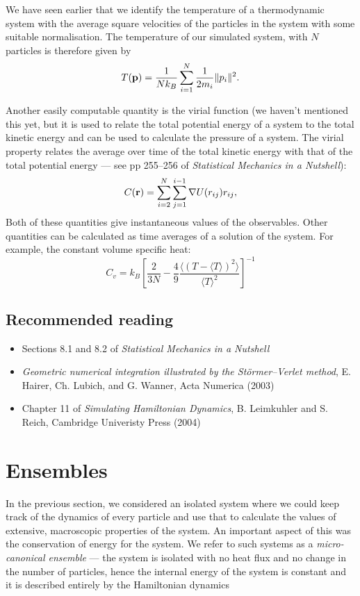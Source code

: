 \documentclass{article}
\begin{document}
We have seen earlier that we identify the temperature of a thermodynamic system with the average square velocities of the particles in the system with some suitable normalisation. The temperature of our simulated system, with $N$ particles is therefore given by
$$
	T({\bf p}) = \frac{1}{Nk_B}\sum_{i=1}^N\frac{1}{2m_i}\|p_i\|^2.
$$

Another easily computable quantity is the virial function (we haven't mentioned this yet, but it is used to relate the total potential energy of a system to the total kinetic energy and can be used to calculate the pressure of a system. The virial property relates the average over time of the total kinetic energy with that of the total potential energy --- see pp 255--256 of \emph{Statistical Mechanics in a Nutshell}):
$$
	C({\bf r}) = \sum_{i=2}^N\sum_{j=1}^{i-1}\nabla U(r_{ij})r_{ij},
$$
Both of these quantities give instantaneous values of the observables. Other quantities can be calculated as time averages of a solution of the system. For example, the constant volume specific heat:
$$
	C_v = k_B\left[\frac{2}{3N}-\frac{4}{9}\frac{\langle(T-\langle T\rangle)^2\rangle}{\langle T\rangle^2}\right]^{-1}
$$

\subsection{Recommended reading}
\begin{itemize}
	\item Sections 8.1 and 8.2 of \emph{Statistical Mechanics in a Nutshell}
	\item \emph{Geometric numerical integration illustrated by the St\"{o}rmer–Verlet method}, E. Hairer, Ch. Lubich, and G. Wanner, Acta Numerica (2003)
	\item Chapter 11 of \emph{Simulating Hamiltonian Dynamics}, B. Leimkuhler and S. Reich, Cambridge Univeristy Press (2004)
\end{itemize}

\section{Ensembles}

In the previous section, we considered an isolated system where we could keep track of the dynamics of every particle and use that to calculate the values of extensive, macroscopic properties of the system. An important aspect of this was the conservation of energy for the system. We refer to such systems as a \emph{micro-canonical ensemble} --- the system is isolated with no heat flux and no change in the number of particles, hence the internal energy of the system is constant and it is described entirely by the Hamiltonian dynamics
\end{document}
